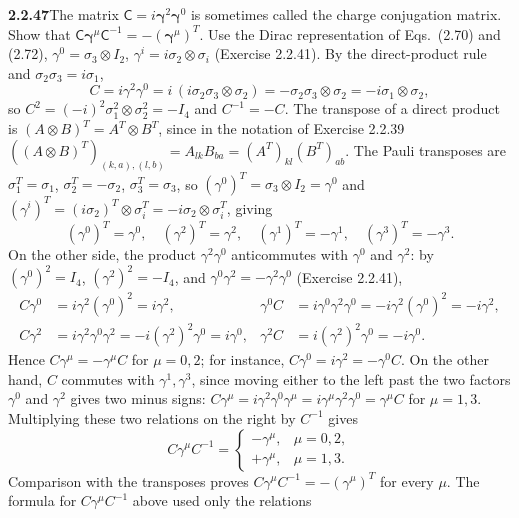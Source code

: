 \par\bigskip
\noindent\textbf{2.2.47}\quad The matrix
$\mathsf{C}=i\boldsymbol{\gamma}^{2}\boldsymbol{\gamma}^{0}$ is sometimes
called the charge conjugation matrix. Show that
$\mathsf{C}\boldsymbol{\gamma}^{\mu}\mathsf{C}^{-1}
=-(\boldsymbol{\gamma}^{\mu})^{T}$.
\solution
Use the Dirac representation of Eqs.~(2.70) and (2.72),
$\gamma^0=\sigma_3\otimes I_2$, $\gamma^i=i\sigma_2\otimes\sigma_i$
(Exercise 2.2.41). By the direct-product rule and
$\sigma_2\sigma_3=i\sigma_1$,
\[
C=i\gamma^2\gamma^0=i\,(i\sigma_2\sigma_3\otimes\sigma_2)
=-\sigma_2\sigma_3\otimes\sigma_2
=-i\sigma_1\otimes\sigma_2,
\]
so $C^2=(-i)^2\sigma_1^2\otimes\sigma_2^2=-I_4$ and $C^{-1}=-C$.
The transpose of a direct product is $(A\otimes B)^T=A^T\otimes B^T$,
since in the notation of Exercise 2.2.39
$((A\otimes B)^T)_{(k,a),(l,b)}=A_{lk}B_{ba}=(A^T)_{kl}(B^T)_{ab}$.
The Pauli transposes are
$\sigma_1^T=\sigma_1$, $\sigma_2^T=-\sigma_2$, $\sigma_3^T=\sigma_3$,
so $(\gamma^0)^T=\sigma_3\otimes I_2=\gamma^0$ and
$(\gamma^i)^T=(i\sigma_2)^T\otimes\sigma_i^T=-i\sigma_2\otimes\sigma_i^T$,
giving
\[
(\gamma^0)^T=\gamma^0,\quad(\gamma^2)^T=\gamma^2,\quad
(\gamma^1)^T=-\gamma^1,\quad(\gamma^3)^T=-\gamma^3.
\]
On the other side, the product $\gamma^2\gamma^0$ anticommutes with
$\gamma^0$ and $\gamma^2$: by $(\gamma^0)^2=I_4$, $(\gamma^2)^2=-I_4$,
and $\gamma^0\gamma^2=-\gamma^2\gamma^0$ (Exercise 2.2.41),
\[
\begin{aligned}
C\gamma^0&=i\gamma^2(\gamma^0)^2=i\gamma^2,&
\gamma^0C&=i\gamma^0\gamma^2\gamma^0=-i\gamma^2(\gamma^0)^2=-i\gamma^2,\\
C\gamma^2&=i\gamma^2\gamma^0\gamma^2=-i(\gamma^2)^2\gamma^0=i\gamma^0,&
\gamma^2C&=i(\gamma^2)^2\gamma^0=-i\gamma^0.
\end{aligned}
\]
Hence $C\gamma^\mu=-\gamma^\mu C$ for $\mu=0,2$; for instance,
$C\gamma^0=i\gamma^2=-\gamma^0C$. On the other hand, $C$ commutes with
$\gamma^1,\gamma^3$, since moving either to the left
past the two factors $\gamma^0$ and $\gamma^2$ gives two minus signs:
$C\gamma^\mu=i\gamma^2\gamma^0\gamma^\mu=i\gamma^\mu\gamma^2\gamma^0
=\gamma^\mu C$ for $\mu=1,3$. Multiplying these two relations on the
right by $C^{-1}$ gives
\[
C\gamma^\mu C^{-1}=
\begin{cases}-\gamma^\mu,&\mu=0,2,\\+\gamma^\mu,&\mu=1,3.\end{cases}
\]
Comparison with the transposes proves
$\boxed{C\gamma^\mu C^{-1}=-(\gamma^\mu)^T}$ for every $\mu$.
The formula for $C\gamma^\mu C^{-1}$ above used only the relations
